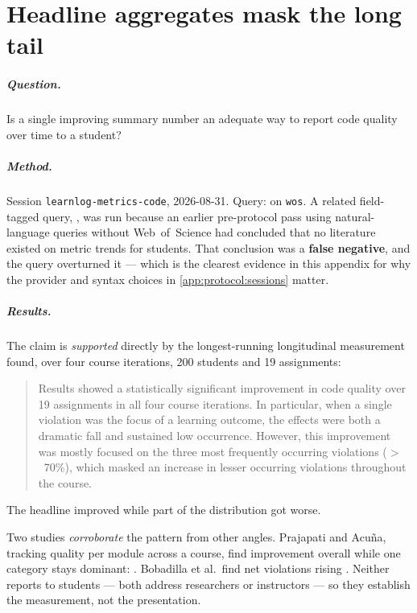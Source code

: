 \chapter{Headline aggregates mask the long tail}
\label{app:claim:long-tail}

\paragraph{Question.}
Is a single improving summary number an adequate way to report code quality
over time to a student?

\paragraph{Method.}
Session \texttt{learnlog-metrics-code}, 2026-08-31.  Query:
 on \texttt{wos}.  A related field-tagged
query, , was run because an earlier pre-protocol pass
using natural-language queries without Web~of~Science had concluded that no
literature existed on metric trends for students.  That conclusion was a
\textbf{false negative}, and the query overturned it --- which is the
clearest evidence in this appendix for why the provider and syntax choices
in \cref{app:protocol:sessions} matter.

\paragraph{Results.}
The claim is \emph{supported} directly by the longest-running longitudinal
measurement found, over four course iterations, 200 students and 19
assignments:
\blockcquote{Ostlund2023}{Results showed a statistically significant
improvement in code quality over 19 assignments in all four course
iterations. In particular, when a single violation was the focus of a
learning outcome, the effects were both a dramatic fall and sustained low
occurrence. However, this improvement was mostly focused on the three most
frequently occurring violations ($>$~70\%), which masked an increase in lesser
occurring violations throughout the course.}
The headline improved while part of the distribution got worse.

Two studies \emph{corroborate} the pattern from other angles.  Prajapati and
Acuña, tracking quality per module across a course, find improvement overall
while one category stays dominant:
.  Bobadilla et
al.\ find net violations rising \autocite{Bobadilla2024}.  Neither reports to
students --- both address researchers or instructors --- so they establish
the measurement, not the presentation.

